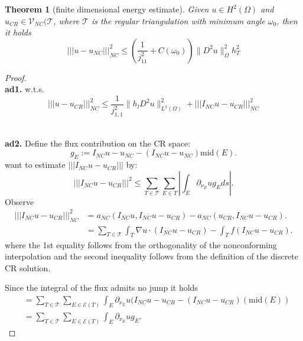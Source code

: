 \documentclass[a4paper,12pt,oneside,fleqn]{book}
\newtheorem{theorem}{Theorem}[section]
\theoremstyle{definition}
\theoremstyle{remark}
\begin{document}
\begin{theorem}[finite dimensional energy estimate]
	Given $u \in H^2(\Omega)$ and $u_{CR} \in \mathcal{V}_{NC}(\mathcal{T}$, where $\mathcal{T}$ is the regular triangulation with minimum angle $\omega_0$, then it holds
	\begin{equation}
		|||u - u_{NC}|||_{NC}^2 \le (\frac{1}{j_{11}^2} + C(\omega_0))\|D^2 u \|_\Omega^2 h_T^2
	\end{equation}
\end{theorem}
\begin{proof}
\quad\\
\textbf{ad1. } w.t.s.
\begin{equation*}
	|||u - u_{CR}|||_{NC}^2 \le \frac{1}{j_{1, 1}^2}\|h_l D^2 u\|_{L^2(\Omega)}^2 + |||I_{NC} u - u_{CR}|||_{NC}^2
\end{equation*}


\quad\\
\textbf{ad2.} Define the flux contribution on the CR space:
\begin{equation}
	g_E:= I_{NC}u - u_{NC}  - (I_{NC}u - u_{NC})\text{mid}(E). 
\end{equation}
want to estimate $|||I_{NC}u - u_{CR}|||$ by:
\begin{equation}
	|||I_{NC}u -  u_{CR}|||^2 \le \sum_{T \in \mathcal{T}} \sum_{E \in T} |\int_E  \partial_{\nu_E} u  g_E ds|.  
\end{equation}
Observe
\begin{align*}
	|||I_{NC}u - u_{CR}|||^2_{NC} &= a_{NC}(I_{NC}u, I_{NC}u - u_{CR})  - a_{NC}(u_{CR}, I_{NC}u - u_{CR}). \\
	&= \sum_{T \in \mathcal{T}} \int_T \nabla u \cdot (I_{NC}u - u_{CR}) - \int_T f (I_{NC}u - u_{CR}). 
\end{align*}
where the 1st equality follows from the orthogonality of the nonconforming interpolation and the second inequality follows from the definition of the discrete CR solution.\par 
Since the integral of the flux admits no jump it holds
\begin{align*}
	& = \sum_{T \in \mathcal{T}} \sum_{E \in \mathcal{E}(T)} \int_E \partial_{\nu_E} u (I_{NC}u - u_{CR} - (I_{NC}u - u_{CR})(\text{mid}(E))\\
	&= \sum_{T \in \mathcal{T}} \sum_{E \in \mathcal{E}(T)} \int_E \partial_{\nu_E} u g_E. 
\end{align*}  



\end{proof}
\end{document}
